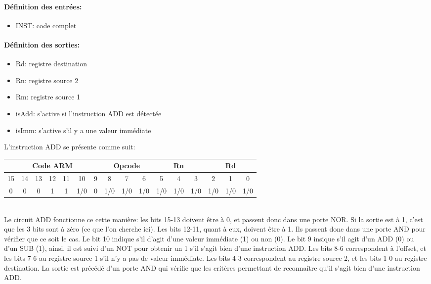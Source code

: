 \documentclass[a4paper]{article} %
\begin{document}
\paragraph{Définition des entrées:}
\begin{itemize}
    \item     INST: code complet
\end{itemize}

\paragraph{Définition des sorties:}
\begin{itemize}
    \item     Rd: registre destination
    \item     Rn: registre source 2
    \item     Rm: registre source 1
    \item     isAdd: s'active si l'instruction ADD est détectée
    \item     isImm: s'active s'il y a une valeur immédiate
\end{itemize}
\medskip 

L'instruction ADD se présente comme suit:

\begin{tabular}{|ccccccc|ccc|ccc|ccc|}
    \hline
    \multicolumn{7}{|c|}{Code ARM}  & \multicolumn{3}{|c|}{Opcode} & \multicolumn{3}{|c|}{Rn} & \multicolumn{3}{|c|}{Rd}\\
    \hline
    15 & 14 & 13 & 12 & 11 & 10  & 9 & 8   & 7   & 6                 & 5 & 4 & 3                & 2   & 1   & 0 \\
    \hline
    0  & 0  & 0  & 1  & 1  & 1/0 & 0 & 1/0 & 1/0 & 1/0               & 1/0 & 1/0 & 1/0                & 1/0 & 1/0 & 1/0 \\
    \hline     
    \end{tabular}
     \medskip \\
    Le circuit ADD fonctionne ce cette manière: les bits 15-13 doivent être à 0, et passent donc dans une porte NOR. Si la sortie est à 1, c'est que les 3 bits sont à zéro (ce que l'on cherche ici). Les bits 12-11, quant à eux, doivent être à 1. Ils passent donc dans une porte AND pour vérifier que ce soit le cas. Le bit 10 indique s'il d'agit d'une valeur immédiate (1) ou non (0). Le bit 9 insique s'il agit d'un ADD (0) ou d'un SUB (1), ainsi, il est suivi d'un NOT pour obtenir un 1 s'il s'agit bien d'une instruction ADD. Les bits 8-6 correspondent à l'offset, et les bits 7-6 au registre source 1 s'il n'y a pas de valeur immédiate. Les bits 4-3 correspondent au registre source 2, et les bits 1-0 au registre destination.
    La sortie est précédé d'un porte AND qui vérifie que les critères permettant de reconnaître qu'il s'agit bien d'une instruction ADD.
    
\end{document}
